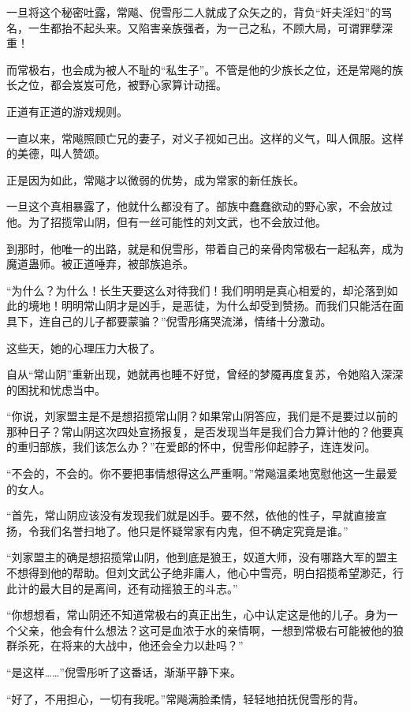 \begin{this_body}
一旦将这个秘密吐露，常飚、倪雪彤二人就成了众矢之的，背负“奸夫淫妇”的骂名，一生都抬不起头来。又陷害亲族强者，为一己之私，不顾大局，可谓罪孽深重！

而常极右，也会成为被人不耻的“私生子”。不管是他的少族长之位，还是常飚的族长之位，都会岌岌可危，被野心家算计动摇。

正道有正道的游戏规则。

一直以来，常飚照顾亡兄的妻子，对义子视如己出。这样的义气，叫人佩服。这样的美德，叫人赞颂。

正是因为如此，常飚才以微弱的优势，成为常家的新任族长。

一旦这个真相暴露了，他就什么都没有了。部族中蠢蠢欲动的野心家，不会放过他。为了招揽常山阴，但有一丝可能性的刘文武，也不会放过他。

到那时，他唯一的出路，就是和倪雪彤，带着自己的亲骨肉常极右一起私奔，成为魔道蛊师。被正道唾弃，被部族追杀。

“为什么？为什么！长生天要这么对待我们！我们明明是真心相爱的，却沦落到如此的境地！明明常山阴才是凶手，是恶徒，为什么却受到赞扬。而我们只能活在面具下，连自己的儿子都要蒙骗？”倪雪彤痛哭流涕，情绪十分激动。

这些天，她的心理压力大极了。

自从“常山阴”重新出现，她就再也睡不好觉，曾经的梦魇再度复苏，令她陷入深深的困扰和忧虑当中。

“你说，刘家盟主是不是想招揽常山阴？如果常山阴答应，我们是不是要过以前的那种日子？常山阴这次四处宣扬报复，是否发现当年是我们合力算计他的？他要真的重归部族，我们该怎么办？”在爱郎的怀中，倪雪彤仰起脖子，连连发问。

“不会的，不会的。你不要把事情想得这么严重啊。”常飚温柔地宽慰他这一生最爱的女人。

“首先，常山阴应该没有发现我们就是凶手。要不然，依他的性子，早就直接宣扬，令我们名誉扫地了。他只是怀疑常家有内鬼，但不确定究竟是谁。”

“刘家盟主的确是想招揽常山阴，他到底是狼王，奴道大师，没有哪路大军的盟主不想得到他的帮助。但刘文武公子绝非庸人，他心中雪亮，明白招揽希望渺茫，行此计的最大目的是离间，还有动摇狼王的斗志。”

“你想想看，常山阴还不知道常极右的真正出生，心中认定这是他的儿子。身为一个父亲，他会有什么想法？这可是血浓于水的亲情啊，一想到常极右可能被他的狼群杀死，在将来的大战中，他还会全力以赴吗？”

“是这样……”倪雪彤听了这番话，渐渐平静下来。

“好了，不用担心，一切有我呢。”常飚满脸柔情，轻轻地拍抚倪雪彤的背。


\end{this_body}
